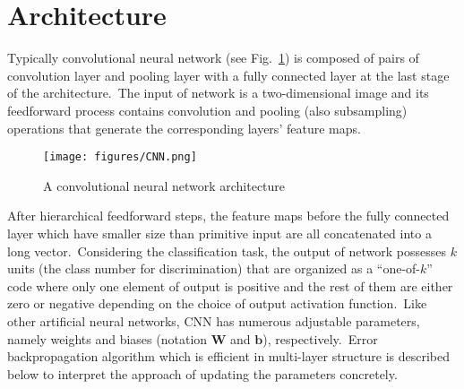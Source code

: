 \section{Architecture}
Typically convolutional neural network (see Fig.~\ref{fig:CNN}) is composed of pairs of convolution layer and pooling layer with a fully connected layer at the last stage of the architecture.~The input of network is a two-dimensional image and its feedforward process contains convolution and pooling (also subsampling) operations that generate the corresponding layers' feature maps.
\begin{figure}[htbp]
	\centering
	\texttt{[image: figures/CNN.png]}
	\caption{A convolutional neural network architecture} \label{fig:CNN}
\end{figure}
After hierarchical feedforward steps, the feature maps before the fully connected layer which have smaller size than primitive input are all concatenated into a long vector.~Considering the classification task, the output of network possesses $k$ units (the class number for discrimination) that are organized as a ``one-of-$k$'' code where only one element of output is positive and the rest of them are either zero or negative depending on the choice of output activation function.~Like other artificial neural networks, CNN has numerous adjustable parameters, namely weights and biases (notation $\bm{W}$ and $\bm{b}$), respectively.~Error backpropagation algorithm which is efficient in multi-layer structure is described below to interpret the approach of updating the parameters concretely.